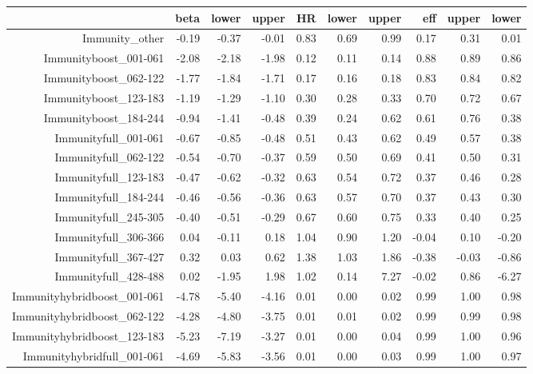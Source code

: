 \begin{table}[ht]
\centering
\begin{tabular}{rrrrrrrrrr}
  \hline
 & beta & lower & upper & HR & lower & upper & eff & upper & lower \\ 
  \hline
Immunity\_other & -0.19 & -0.37 & -0.01 & 0.83 & 0.69 & 0.99 & 0.17 & 0.31 & 0.01 \\ 
  Immunityboost\_001-061 & -2.08 & -2.18 & -1.98 & 0.12 & 0.11 & 0.14 & 0.88 & 0.89 & 0.86 \\ 
  Immunityboost\_062-122 & -1.77 & -1.84 & -1.71 & 0.17 & 0.16 & 0.18 & 0.83 & 0.84 & 0.82 \\ 
  Immunityboost\_123-183 & -1.19 & -1.29 & -1.10 & 0.30 & 0.28 & 0.33 & 0.70 & 0.72 & 0.67 \\ 
  Immunityboost\_184-244 & -0.94 & -1.41 & -0.48 & 0.39 & 0.24 & 0.62 & 0.61 & 0.76 & 0.38 \\ 
  Immunityfull\_001-061 & -0.67 & -0.85 & -0.48 & 0.51 & 0.43 & 0.62 & 0.49 & 0.57 & 0.38 \\ 
  Immunityfull\_062-122 & -0.54 & -0.70 & -0.37 & 0.59 & 0.50 & 0.69 & 0.41 & 0.50 & 0.31 \\ 
  Immunityfull\_123-183 & -0.47 & -0.62 & -0.32 & 0.63 & 0.54 & 0.72 & 0.37 & 0.46 & 0.28 \\ 
  Immunityfull\_184-244 & -0.46 & -0.56 & -0.36 & 0.63 & 0.57 & 0.70 & 0.37 & 0.43 & 0.30 \\ 
  Immunityfull\_245-305 & -0.40 & -0.51 & -0.29 & 0.67 & 0.60 & 0.75 & 0.33 & 0.40 & 0.25 \\ 
  Immunityfull\_306-366 & 0.04 & -0.11 & 0.18 & 1.04 & 0.90 & 1.20 & -0.04 & 0.10 & -0.20 \\ 
  Immunityfull\_367-427 & 0.32 & 0.03 & 0.62 & 1.38 & 1.03 & 1.86 & -0.38 & -0.03 & -0.86 \\ 
  Immunityfull\_428-488 & 0.02 & -1.95 & 1.98 & 1.02 & 0.14 & 7.27 & -0.02 & 0.86 & -6.27 \\ 
  Immunityhybridboost\_001-061 & -4.78 & -5.40 & -4.16 & 0.01 & 0.00 & 0.02 & 0.99 & 1.00 & 0.98 \\ 
  Immunityhybridboost\_062-122 & -4.28 & -4.80 & -3.75 & 0.01 & 0.01 & 0.02 & 0.99 & 0.99 & 0.98 \\ 
  Immunityhybridboost\_123-183 & -5.23 & -7.19 & -3.27 & 0.01 & 0.00 & 0.04 & 0.99 & 1.00 & 0.96 \\ 
  Immunityhybridfull\_001-061 & -4.69 & -5.83 & -3.56 & 0.01 & 0.00 & 0.03 & 0.99 & 1.00 & 0.97 \\ 

\end{tabular}
\end{table}
